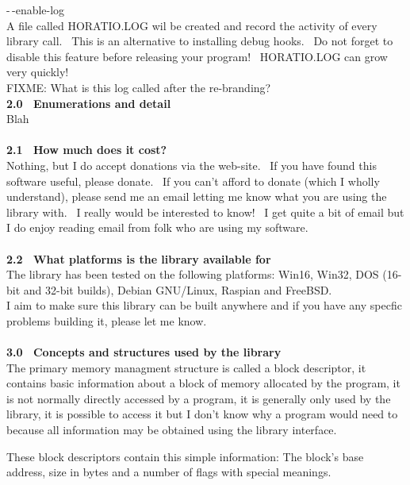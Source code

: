 \documentclass{article}
\begin{document}
\par -$\,$-enable-log
\\
A file called HORATIO.LOG wil be created and record the activity of
every library call.~ This is an alternative to installing debug
hooks.~ Do not forget to disable this feature before releasing
your program!~ HORATIO.LOG can grow very quickly!\\
FIXME: What is this log called after the re-branding?
\\
\textbf{2.0~ Enumerations and detail}\\
Blah\\
\\
\textbf{2.1~ How much does it cost?}
\\
Nothing, but I do accept donations via the web-site.~ If you have
found this software useful, please donate.~ If you can't afford to
donate (which I wholly understand), please send me an email letting me
know what you are using the library with.~ I really would be
interested to know!~ I get quite a bit of email but I do enjoy
reading email from folk who are using my software.\\
\\
\textbf{2.2~ What platforms is the library available for}
\\
The library has been tested on the following platforms: Win16, Win32,
DOS (16-bit and 32-bit builds), Debian GNU/Linux, Raspian and FreeBSD.\\
I aim to make sure this library can be built anywhere and if you have
any specfic problems building it, please let me know.\\
\\
\textbf{3.0~ Concepts and structures used by the library}
\\
The primary memory managment structure is called a block descriptor,
it contains basic information about a block of memory allocated by the
program, it is not normally directly accessed by a program, it is
generally
only used by the library, it is possible to access it but I don't know
why a program would need to because all information may be obtained
using
the library interface.
\par These block descriptors contain this simple information: The block's
base address, size in bytes and a number of flags with special
meanings.
\end{document}

